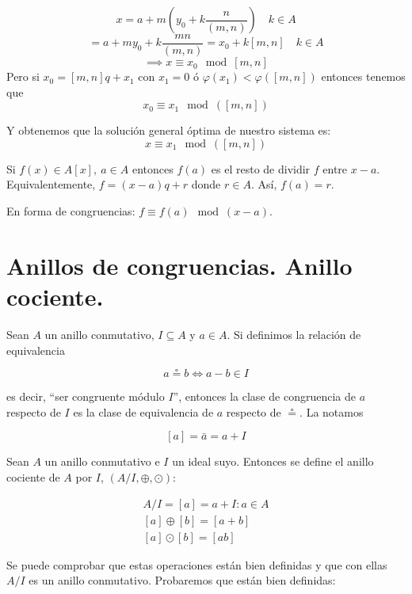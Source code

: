 \[
x = a +m(y_0 +  k\frac{n}{(m,n)}) \quad k \in A
\]
\[
 = a+my_0 + k \frac{mn}{(m,n)} = x_0 +k[m,n] \quad k \in A
\]
\[
\implies x \equiv x_0 \mod [m,n]
\]
Pero si $x_0 = [m,n]q + x_1$ con $x_1 = 0 $ ó $\varphi(x_1) < \varphi([m,n])$ entonces tenemos que $$x_0 \equiv x_1 \mod([m,n])$$

Y obtenemos que la solución general óptima de nuestro sistema es:
\[
x \equiv x_1 \mod([m,n])
\]


\begin{nth}
	Si $f(x) \in A[x], \ a \in A$ entonces $f(a)$ es el resto de dividir $f$ entre $x-a$.
	Equivalentemente, $f = (x-a)q+r$ donde $r\in A$. Así, $f(a) = r$.

	En forma de congruencias: $f \equiv f(a)\mod(x-a)$.
\end{nth}
\section{Anillos de congruencias. Anillo cociente.}


\begin{ndef}
  Sean $A$ un anillo conmutativo, $I \subseteq A$ y $a \in A$. Si definimos la relación de equivalencia

  \[
    a \circeq b \iff a - b \in I
  \]

  es decir, ``ser congruente módulo $I$'', entonces la clase de congruencia de $a$ respecto de $I$ es la clase de equivalencia de $a$ respecto de $\circeq$. La notamos

  \[
    [a] = \bar{a} = a+I
  \]
\end{ndef}



\begin{ndef}
  Sean $A$ un anillo conmutativo e $I$ un ideal suyo. Entonces se define el anillo cociente de $A$ por $I$, $(A/I, \oplus, \odot)$:

  \[
  \begin{array}{l}
    A/I = { [a] = a+I : a \in A} \\
    {[a]} \oplus [b] = [a+b] \\
    {[a]} \odot [b] = [ab]
  \end{array}
  \]
\end{ndef}

Se puede comprobar que estas operaciones están bien definidas y que con ellas $A/I$ es un anillo conmutativo. Probaremos que están bien definidas:

